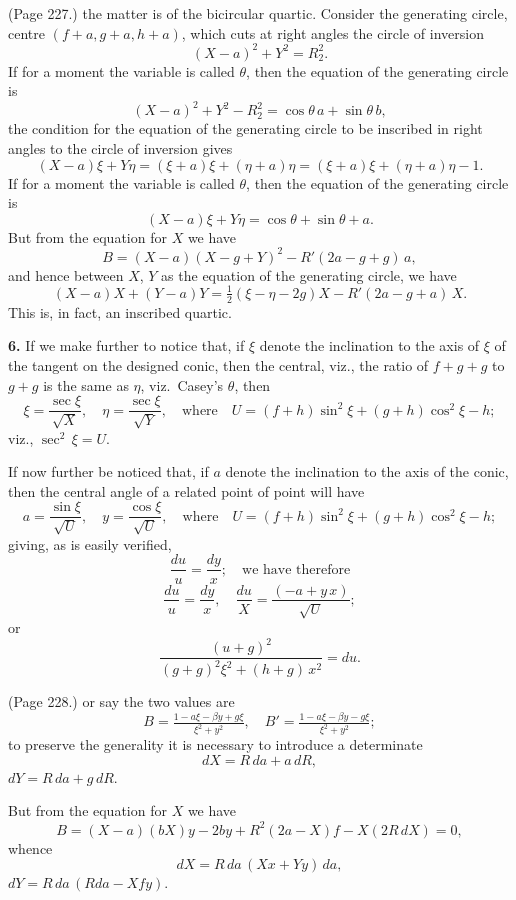 \documentclass[11pt,a4paper]{book}
\begin{document}
\medskip

\noindent (Page 227.) the matter is of the bicircular quartic. Consider the generating circle, centre $(f + a, g + a, h + a)$, which cuts at right angles the circle of inversion
\[
(X - a)^2 + Y^2 = R_2^2.
\]
If for a moment the variable is called $\theta$, then the equation of the generating circle is
\[
(X - a)^2 + Y^2 - R_2^2 = \cos\theta\,a + \sin\theta\,b,
\]
the condition for the equation of the generating circle to be inscribed in right angles to the circle of inversion gives
\[
(X - a)\xi + Y\eta = (\xi + a)\xi + (\eta + a)\eta = (\xi + a)\xi + (\eta + a)\eta - 1.
\]
If for a moment the variable is called $\theta$, then the equation of the generating circle is
\[
(X - a)\xi + Y\eta = \cos\theta + \sin\theta + a.
\]
But from the equation for $X$ we have
\[
B = (X - a) (X - g + Y)^2 - R'(2 a - g + g)\,a,
\]
and hence between $X$, $Y$ as the equation of the generating circle, we have
\[
(X - a) X + (Y - a) Y = \tfrac{1}{2}(\xi - \eta - 2 g) X - R'(2 a - g + a)\,X.
\]
This is, in fact, an inscribed quartic.

\medskip

\noindent\textbf{6.} If we make further to notice that, if $\xi$ denote the inclination to the axis of $\xi$ of the tangent on the designed conic, then the central, viz., the ratio of $f + g + g$ to $g + g$ is the same as $\eta$, viz.\ Casey's $\theta$, then
\[
\xi = \frac{\sec\xi}{\sqrt{X}}, \quad \eta = \frac{\sec\xi}{\sqrt{Y}}, \quad \text{where} \quad U = (f + h)\sin^2 \xi + (g + h)\cos^2\xi - h;
\]
viz., $\sec^2\,\xi = U$.

If now further be noticed that, if $a$ denote the inclination to the axis of the conic, then the central angle of a related point of point will have
\[
a = \frac{\sin\xi}{\sqrt{U}}, \quad y = \frac{\cos\xi}{\sqrt{U}}, \quad \text{where} \quad U = (f + h)\sin^2\xi + (g + h)\cos^2\xi - h;
\]
giving, as is easily verified,
\[
\frac{du}{u} = \frac{dy}{x}; \quad \text{we have therefore}
\]
\[
\frac{du}{u} = \frac{dy}{x},\quad \frac{du}{X} = \frac{(- a + y\,x)}{\sqrt{U}};
\]
or
\[
\frac{(u + g)^2}{(g + g)^2 \xi^2 + (h + g)\,x^2} = du.
\]

\medskip

\noindent (Page 228.) or say the two values are
\[
B = \tfrac{1 - a\xi - \beta y + g\xi}{\xi^2 + y^2}, \quad B' = \tfrac{1 - a\xi - \beta y - g\xi}{\xi^2 + y^2};
\]
to preserve the generality it is necessary to introduce a determinate
\[
dX = R\,da + a\,dR,
\]
$d Y = R\,d a + g\,d R$.

But from the equation for $X$ we have
\[
B = (X - a)(b X)y - 2 b y + R^2(2 a - X)f - X(2 R\,d X) = 0,
\]
whence
\[
dX = R\,da\,(Xx + Y y)\,da,
\]
$dY = R\,da\,(R d a - X f y)$.
\end{document}
